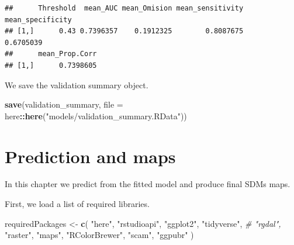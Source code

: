 \documentclass[
]{book}
\newenvironment{Shaded}{\begin{snugshade}}{\end{snugshade}}
\newcommand{\AttributeTok}[1]{\textcolor[rgb]{0.13,0.29,0.53}{#1}}
\newcommand{\CommentTok}[1]{\textcolor[rgb]{0.56,0.35,0.01}{\textit{#1}}}
\newcommand{\FunctionTok}[1]{\textcolor[rgb]{0.13,0.29,0.53}{\textbf{#1}}}
\newcommand{\NormalTok}[1]{#1}
\newcommand{\OtherTok}[1]{\textcolor[rgb]{0.56,0.35,0.01}{#1}}
\newcommand{\SpecialCharTok}[1]{\textcolor[rgb]{0.81,0.36,0.00}{\textbf{#1}}}
\newcommand{\StringTok}[1]{\textcolor[rgb]{0.31,0.60,0.02}{#1}}
\begin{document}
\begin{Shaded}
\end{Shaded}

\begin{verbatim}
##      Threshold  mean_AUC mean_Omision mean_sensitivity mean_specificity
## [1,]      0.43 0.7396357    0.1912325        0.8087675        0.6705039
##      mean_Prop.Corr
## [1,]      0.7398605
\end{verbatim}

We save the validation summary object.

\begin{Shaded}
\begin{Highlighting}[]
\FunctionTok{save}\NormalTok{(validation\_summary, }\AttributeTok{file =}\NormalTok{ here}\SpecialCharTok{::}\FunctionTok{here}\NormalTok{(}\StringTok{"models/validation\_summary.RData"}\NormalTok{))}
\end{Highlighting}
\end{Shaded}

\chapter{Prediction and maps}\label{prediction-and-maps}

In this chapter we predict from the fitted model and produce final SDMs maps.

First, we load a list of required libraries.

\begin{Shaded}
\begin{Highlighting}[]
\NormalTok{requiredPackages }\OtherTok{\textless{}{-}} \FunctionTok{c}\NormalTok{(}
  \StringTok{"here"}\NormalTok{, }
  \StringTok{"rstudioapi"}\NormalTok{, }
  \StringTok{"ggplot2"}\NormalTok{, }
  \StringTok{"tidyverse"}\NormalTok{, }
  \CommentTok{\# "rgdal", }
  \StringTok{"raster"}\NormalTok{, }
  \StringTok{"maps"}\NormalTok{, }
  \StringTok{"RColorBrewer"}\NormalTok{, }
  \StringTok{"scam"}\NormalTok{, }
  \StringTok{"ggpubr"}
\NormalTok{  )}
\end{Highlighting}
\end{Shaded}
\end{document}
